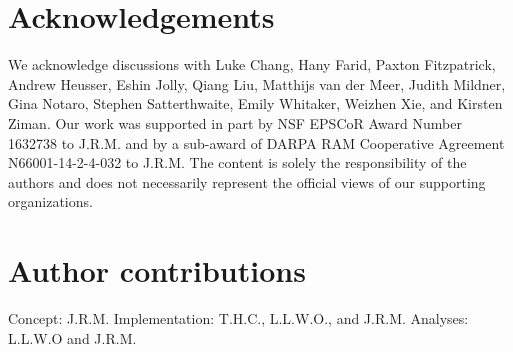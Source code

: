 \documentclass[english]{article}
\begin{document}
\section*{Acknowledgements}
We acknowledge discussions with Luke Chang, Hany Farid, Paxton
Fitzpatrick, Andrew Heusser, Eshin Jolly, Qiang Liu, Matthijs van der
Meer, Judith Mildner, Gina Notaro, Stephen Satterthwaite, Emily
Whitaker, Weizhen Xie, and Kirsten Ziman. Our work was supported in
part by NSF EPSCoR Award Number 1632738 to J.R.M. and by a sub-award
of DARPA RAM Cooperative Agreement N66001-14-2-4-032 to J.R.M.  The
content is solely the responsibility of the authors and does not
necessarily represent the official views of our supporting
organizations.

\section*{Author contributions}
Concept: J.R.M.  Implementation: T.H.C., L.L.W.O., and
J.R.M.  Analyses: L.L.W.O and J.R.M.



\end{document}
